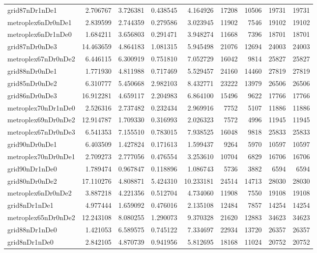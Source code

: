 \begin{longtable}{|l|r|r|r|r|r|r|r|r|}
grid87nDr1nDe1 & 2.706767 & 3.726381 & 0.438545 & 4.164926 & 17208 & 10506 & 19731 & 19731 \\
metroplex6nDr0nDe1 & 2.839599 & 2.744359 & 0.279586 & 3.023945 & 11902 & 7546 & 19102 & 19102 \\
metroplex6nDr1nDe0 & 1.684211 & 3.656803 & 0.291471 & 3.948274 & 11668 & 7396 & 18701 & 18701 \\
grid87nDr0nDe3 & 14.463659 & 4.864183 & 1.081315 & 5.945498 & 21076 & 12694 & 24003 & 24003 \\
metroplex67nDr0nDe2 & 6.446115 & 6.300919 & 0.751810 & 7.052729 & 16042 & 9814 & 25827 & 25827 \\
grid88nDr0nDe1 & 1.771930 & 4.811988 & 0.717469 & 5.529457 & 24160 & 14460 & 27819 & 27819 \\
grid85nDr0nDe2 & 6.310777 & 5.450668 & 2.982103 & 8.432771 & 23222 & 13979 & 26506 & 26506 \\
grid86nDr0nDe3 & 16.912281 & 4.659117 & 2.204983 & 6.864100 & 15496 & 9622 & 17766 & 17766 \\
metroplex70nDr1nDe0 & 2.526316 & 2.737482 & 0.232434 & 2.969916 & 7752 & 5107 & 11886 & 11886 \\
metroplex69nDr0nDe2 & 12.914787 & 1.709330 & 0.316993 & 2.026323 & 7572 & 4996 & 11945 & 11945 \\
metroplex67nDr0nDe3 & 6.541353 & 7.155510 & 0.783015 & 7.938525 & 16048 & 9818 & 25833 & 25833 \\
grid90nDr0nDe1 & 6.403509 & 1.427824 & 0.171613 & 1.599437 & 9264 & 5970 & 10597 & 10597 \\
metroplex70nDr0nDe1 & 2.709273 & 2.777056 & 0.476554 & 3.253610 & 10704 & 6829 & 16706 & 16706 \\
grid90nDr1nDe0 & 1.789474 & 0.967847 & 0.118896 & 1.086743 & 5736 & 3882 & 6594 & 6594 \\
grid80nDr0nDe2 & 17.110276 & 4.808871 & 5.424310 & 10.233181 & 24514 & 14713 & 28030 & 28030 \\
metroplex6nDr0nDe2 & 3.887218 & 4.221356 & 0.512704 & 4.734060 & 11908 & 7550 & 19108 & 19108 \\
grid8nDr1nDe1 & 4.977444 & 1.659092 & 0.476016 & 2.135108 & 12484 & 7857 & 14254 & 14254 \\
metroplex65nDr0nDe2 & 12.243108 & 8.080255 & 1.290073 & 9.370328 & 21620 & 12883 & 34623 & 34623 \\
grid88nDr1nDe0 & 1.421053 & 6.589575 & 0.745122 & 7.334697 & 22934 & 13720 & 26357 & 26357 \\
grid8nDr1nDe0 & 2.842105 & 4.870739 & 0.941956 & 5.812695 & 18168 & 11024 & 20752 & 20752 \\

\end{longtable}
